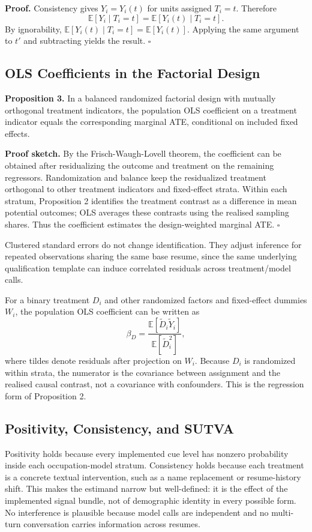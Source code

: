 \documentclass[10pt,twocolumn,letterpaper]{article}
\begin{document}
\textbf{Proof.} Consistency gives $Y_i=Y_i(t)$ for units assigned $T_i=t$. Therefore
\[
\mathbb{E}[Y_i\mid T_i=t]=\mathbb{E}[Y_i(t)\mid T_i=t].
\]
By ignorability, $\mathbb{E}[Y_i(t)\mid T_i=t]=\mathbb{E}[Y_i(t)]$. Applying the same argument to $t'$ and subtracting yields the result. \hfill $\square$

\subsection{OLS Coefficients in the Factorial Design}

\textbf{Proposition 3.} In a balanced randomized factorial design with mutually orthogonal treatment indicators, the population OLS coefficient on a treatment indicator equals the corresponding marginal ATE, conditional on included fixed effects.

\textbf{Proof sketch.} By the Frisch-Waugh-Lovell theorem, the coefficient can be obtained after residualizing the outcome and treatment on the remaining regressors. Randomization and balance keep the residualized treatment orthogonal to other treatment indicators and fixed-effect strata. Within each stratum, Proposition 2 identifies the treatment contrast as a difference in mean potential outcomes; OLS averages these contrasts using the realised sampling shares. Thus the coefficient estimates the design-weighted marginal ATE. \hfill $\square$

Clustered standard errors do not change identification. They adjust inference for repeated observations sharing the same base resume, since the same underlying qualification template can induce correlated residuals across treatment/model calls.

For a binary treatment $D_i$ and other randomized factors and fixed-effect dummies $W_i$, the population OLS coefficient can be written as
\[
\beta_D = \frac{\mathbb{E}[\tilde D_i \tilde Y_i]}{\mathbb{E}[\tilde D_i^2]},
\]
where tildes denote residuals after projection on $W_i$. Because $D_i$ is randomized within strata, the numerator is the covariance between assignment and the realised causal contrast, not a covariance with confounders. This is the regression form of Proposition 2.

\subsection{Positivity, Consistency, and SUTVA}

Positivity holds because every implemented cue level has nonzero probability inside each occupation-model stratum. Consistency holds because each treatment is a concrete textual intervention, such as a name replacement or resume-history shift. This makes the estimand narrow but well-defined: it is the effect of the implemented signal bundle, not of demographic identity in every possible form. No interference is plausible because model calls are independent and no multi-turn conversation carries information across resumes.
\end{document}
